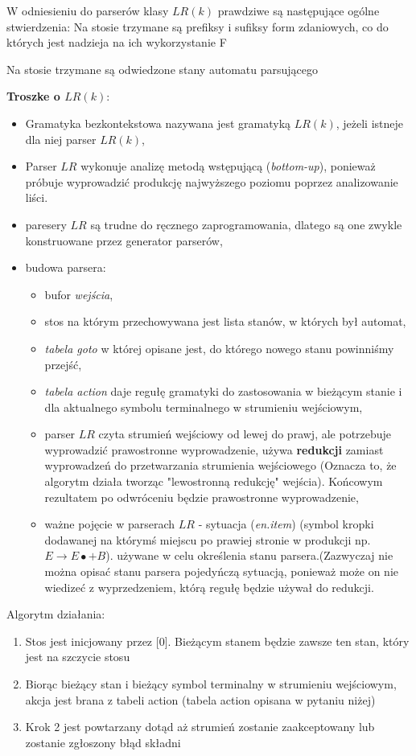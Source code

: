 \answer
{W odniesieniu do parserów klasy $LR(k)$ prawdziwe są następujące ogólne stwierdzenia:}
{Na stosie trzymane są prefiksy i sufiksy form zdaniowych, co do których jest nadzieja na ich wykorzystanie}
{F}
{Na stosie trzymane są odwiedzone stany automatu parsującego

\textbf{Troszke o $LR(k)$}:
\begin{itemize}
\item Gramatyka bezkontekstowa nazywana jest gramatyką $LR(k)$, jeżeli istneje dla niej parser $LR(k)$,
\item Parser $LR$ wykonuje analizę metodą wstępującą (\textit{bottom-up}), ponieważ próbuje wyprowadzić produkcję najwyższego poziomu poprzez analizowanie liści.
\item paresery $LR$ są trudne do ręcznego zaprogramowania, dlatego są one zwykle konstruowane przez generator parserów,
\item budowa parsera:
    \begin{itemize}
    \item bufor \textit{wejścia},
    \item stos na którym przechowywana jest lista stanów, w których był automat,
    \item \textit{tabela goto} w której opisane jest, do którego nowego stanu powinniśmy przejść,
    \item \textit{tabela action} daje regułę gramatyki do zastosowania w bieżącym stanie i dla aktualnego symbolu terminalnego w strumieniu wejściowym,
    \item parser $LR$ czyta strumień wejściowy od lewej do prawj, ale potrzebuje wyprowadzić prawostronne wyprowadzenie, używa \textbf{redukcji} zamiast wyprowadzeń do przetwarzania strumienia wejściowego (Oznacza to, że algorytm działa tworząc "lewostronną redukcję" wejścia). Końcowym rezultatem po odwróceniu będzie prawostronne wyprowadzenie,
    \item ważne pojęcie w parserach $LR$ - sytuacja (\textit{en.item}) (symbol kropki dodawanej na którymś miejscu po prawiej stronie w produkcji np. $E \rightarrow E\bullet + B$). używane w celu określenia stanu parsera.(Zazwyczaj nie można opisać stanu parsera pojedyńczą sytuacją, ponieważ może on nie wiedizeć z wyprzedzeniem, którą regułę będzie używał do redukcji.
    \end{itemize}
\end{itemize}

Algorytm działania:

\begin{enumerate}
\item Stos jest inicjowany przez [0]. Bieżącym stanem będzie zawsze ten stan, który jest na szczycie stosu
\item Biorąc bieżący stan i bieżący symbol terminalny w strumieniu wejściowym, akcja jest brana z tabeli action (tabela action opisana w pytaniu niżej)
\item Krok 2 jest powtarzany dotąd aż strumień zostanie zaakceptowany lub zostanie zgłoszony błąd składni
\end{enumerate}
}
{}

